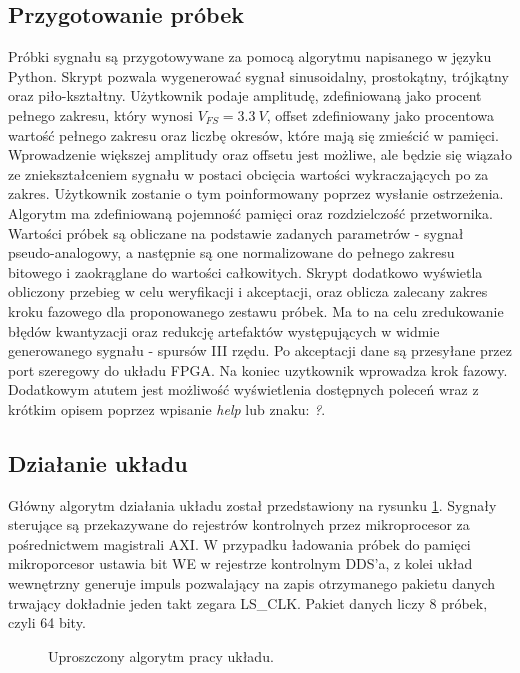     \subsection{Przygotowanie próbek}
        Próbki sygnału są przygotowywane za pomocą algorytmu napisanego w języku Python. Skrypt pozwala wygenerować sygnał sinusoidalny, 
        prostokątny, trójkątny oraz piło-kształtny. Użytkownik podaje amplitudę, zdefiniowaną jako procent pełnego zakresu, który 
        wynosi $V_{FS} = 3.3 \ V$, offset zdefiniowany jako procentowa wartość pełnego zakresu oraz liczbę 
        okresów, które mają się zmieścić w pamięci. Wprowadzenie większej amplitudy oraz offsetu jest możliwe, ale będzie się wiązało 
        ze zniekształceniem sygnału w postaci obcięcia wartości wykraczających po za zakres. Użytkownik zostanie o tym poinformowany 
        poprzez wysłanie ostrzeżenia. Algorytm ma zdefiniowaną pojemność pamięci oraz rozdzielczość przetwornika. 
        Wartości próbek są obliczane na podstawie zadanych parametrów - sygnał pseudo-analogowy, a następnie są one normalizowane 
        do pełnego zakresu bitowego i zaokrąglane do wartości całkowitych. Skrypt dodatkowo wyświetla obliczony przebieg w celu 
        weryfikacji i akceptacji, oraz oblicza zalecany zakres kroku fazowego dla proponowanego zestawu próbek. Ma to na 
        celu zredukowanie błędów kwantyzacji oraz redukcję artefaktów występujących w widmie generowanego sygnału - spursów III rzędu. 
        Po akceptacji dane są przesyłane przez port szeregowy do układu FPGA. Na koniec uzytkownik wprowadza krok fazowy. 
        Dodatkowym atutem jest możliwość wyświetlenia dostępnych poleceń wraz z krótkim opisem poprzez wpisanie \textit{help} 
        lub znaku: \textit{?}. 

    
    \subsection{Działanie układu}
        Główny algorytm działania układu został przedstawiony na rysunku \ref{alg:DDSmain}. Sygnały sterujące są przekazywane do 
        rejestrów kontrolnych przez mikroprocesor za pośrednictwem magistrali AXI. W przypadku ładowania próbek do pamięci 
        mikroporcesor ustawia bit WE w rejestrze kontrolnym DDS'a, z kolei układ wewnętrzny generuje impuls pozwalający na 
        zapis otrzymanego pakietu danych trwający dokładnie jeden takt zegara LS\_CLK. Pakiet danych liczy 8 próbek, czyli 64 bity. 
        \begin{figure}[!ht]
            \centering
            \scalebox{0.7}{}
            \caption{Uproszczony algorytm pracy układu.}
            \label{alg:DDSmain}
        \end{figure}

